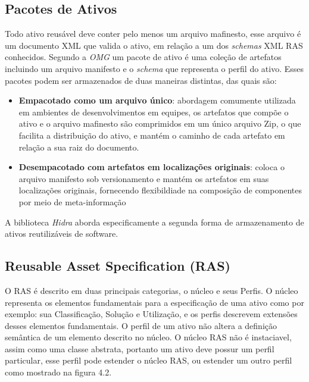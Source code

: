 \subsection{Pacotes de Ativos}

    Todo ativo reusável deve conter pelo menos um arquivo mafinesto, esse arquivo é um documento XML que valida o ativo, em relação a um dos \textit{schemas}  XML RAS conhecidos. Segundo a \textit{OMG} um pacote de ativo é uma coleção de artefatos incluindo um arquivo manifesto e o \textit{schema} que representa o perfil do ativo. Esses pacotes podem ser armazenados de duas maneiras distintas, das quais são:
    \begin{itemize}
    
    \item \textbf{Empacotado como um arquivo único}: abordagem comumente utilizada em ambientes de desenvolvimentos em equipes, os artefatos que compõe o ativo e o arquivo mafinesto são comprimidos em um único arquivo Zip, o que facilita a distribuição do ativo, e mantém o caminho de cada artefato em relação a sua raiz do documento.
    
    \item \textbf{Desempacotado com artefatos em localizações originais}: coloca o arquivo manifesto sob versionamento e mantém os artefatos em suas localizações originais, fornecendo flexibildiade na composição de componentes por meio de meta-informação
    
    \end{itemize}

    A biblioteca \textit{Hidra} aborda especificamente a segunda forma de armazenamento de ativos reutilizáveis de software.

\subsection{Reusable Asset Specification (RAS)}

    O RAS é descrito em duas principais categorias, o núcleo e seus Perfis. O núcleo representa os elementos fundamentais para a especificação de uma ativo como por exemplo: sua Classificação, Solução e Utilização, e os perfis descrevem extensões desses elementos fundamentais. O perfil de um ativo não altera a definição semântica de um elemento descrito no núcleo. O núcleo RAS não é instaciavel, assim como uma classe abstrata, portanto um ativo deve possur um perfil particular, esse perfil pode estender o núcleo RAS, ou estender um outro perfil como mostrado na figura 4.2.


